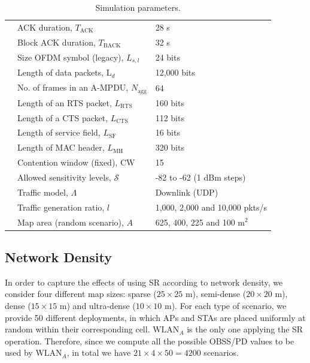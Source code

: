 \documentclass[preprint,12pt]{elsarticle}
\begin{document}
\begin{table}[h]
{\begin{tabular}{c|l|l|}
				\cline{2-3} 
				\multicolumn{1}{|c|}{} & ACK duration, $T_\text{ACK}$ & 28 \textmu s\\
				\cline{2-3} 
				\multicolumn{1}{|c|}{} & Block ACK duration, $T_\text{BACK}$ & 32 \textmu s \\
				\cline{2-3} 
				\multicolumn{1}{|c|}{} &  Size OFDM symbol (legacy), $L_{s,l}$ & 24 bits \\
				\cline{2-3} 
				\multicolumn{1}{|c|}{} & Length of data packets, $\text{L}_{d}$ & 12,000 bits \\
				\cline{2-3} 
				\multicolumn{1}{|c|}{} & No. of frames in an A-MPDU, $N_{\text{agg}}$ & 64 \\
				\cline{2-3} 
				\multicolumn{1}{|c|}{} & Length of an RTS packet, $L_\text{RTS}$ & 160 bits \\
				\cline{2-3} 
				\multicolumn{1}{|c|}{} & Length of a CTS packet, $L_\text{CTS}$ & 112 bits \\
				\cline{2-3} 
				\multicolumn{1}{|c|}{} & Length of service field, $L_\text{SF}$ & 16 bits  \\
				\cline{2-3} 
				\multicolumn{1}{|c|}{} & Length of MAC header, $L_\text{MH}$ & 320 bits \\
				\cline{2-3} 
				\multicolumn{1}{|c|}{} & Contention window (fixed), $\text{CW}$ & 15 \\
				\cline{2-3} 
				\multicolumn{1}{|c|}{} & Allowed sensitivity levels, $\mathcal{S}$ & -82 to -62 (1 dBm steps) \\
				\hline
				\multicolumn{1}{|c|}{\multirow{2}{*}{\centering\rotatebox[origin=c]{90}{Misc.  }}} & Traffic model, $\Lambda$ & Downlink (UDP)\\
				\cline{2-3} 
				\multicolumn{1}{|c|}{} & Traffic generation ratio, $l$ & 1,000, 2,000 and 10,000 pkts/s\\ 
				\cline{2-3} 
				\multicolumn{1}{|c|}{} & Map area (random scenario), $A$ & 625, 400, 225 and 100 m$^2$\\
				\hline
		\end{tabular}}
		\caption{Simulation parameters.}
		\label{table:parameters}
	\end{table}
	
	\subsection{Network Density}
	\label{section:random_scenarios_density}
	In order to capture the effects of using SR according to network density, we consider four different map sizes: sparse ($25\times25$ m), semi-dense ($20\times20$ m), dense ($15\times15$ m) and ultra-dense ($10\times10$ m). For each type of scenario, we provide 50 different deployments, in which APs and STAs are placed uniformly at random within their corresponding cell. $\text{WLAN}_A$ is the only one applying the SR operation. Therefore, since we compute all the possible OBSS/PD values to be used by $\text{WLAN}_A$, in total we have $21\times4\times50 = 4200$ scenarios.
	
\end{document}
